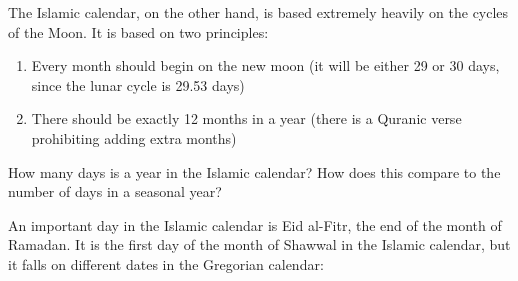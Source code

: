 \documentclass[11pt]{article}
\begin{document}
The Islamic calendar, on the other hand, is based extremely heavily on the cycles of the Moon. It is based on two principles:

\begin{enumerate}
	\item Every month should begin on the new moon (it will be either 29 or 30 days, since the lunar cycle is 29.53 days)
	\item There should be exactly 12 months in a year (there is a Quranic verse prohibiting adding extra months)
\end{enumerate}

How many days is a year in the Islamic calendar? How does this compare to the number of days in a seasonal year?

\vspace{1.2in}
\underline{\hspace{6in}}

An important day in the Islamic calendar is Eid al-Fitr, the end of the month of Ramadan. It is the first day of the month of Shawwal in the Islamic calendar, but it falls on different dates in the Gregorian calendar:
\end{document}
